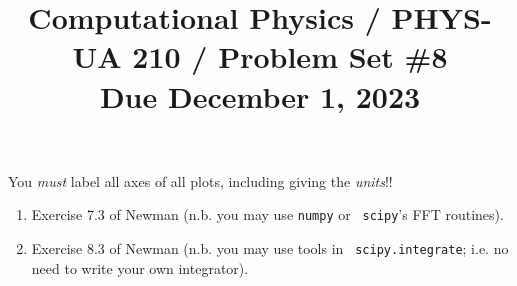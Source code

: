 \documentclass[11pt, preprint]{aastex}
\begin{document}
\title{\bf Computational Physics / PHYS-UA 210 / Problem Set \#8
\\ Due December 1, 2023 }

You {\it must} label all axes of all plots, including giving the {\it
  units}!!

\begin{enumerate} 
\item Exercise 7.3 of Newman (n.b. you may use {\tt numpy} or {\tt
  scipy}'s FFT routines).
\item Exercise 8.3 of Newman (n.b. you may use tools in {\tt
  scipy.integrate}; i.e. no need to write your own integrator).
\end{enumerate} 
\end{document}
